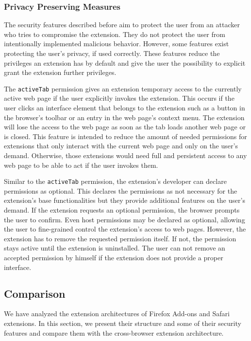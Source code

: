 \subsubsection{Privacy Preserving Measures}

	The security features described before aim to protect the user from an attacker who tries to compromise the extension. They do not protect the user from intentionally implemented malicious behavior. However, some features exist protecting the user's privacy, if used correctly. These features reduce the privileges an extension has by default and give the user the possibility to explicit grant the extension further privileges. 
	
	The \texttt{activeTab} permission gives an extension temporary access to the currently active web page if the user explicitly invokes the extension. This occurs if the user clicks an interface element that belongs to the extension such as a button in the browser's toolbar or an entry in the web page's context menu. The extension will lose the access to the web page as soon as the tab loads another web page or is closed. This feature is intended to reduce the amount of needed permissions for extensions that only interact with the current web page and only on the user's demand. Otherwise, those extensions would need full and persistent access to any web page to be able to act if the user invokes them.
	
	Similar to the \texttt{activeTab} permission, the extension's developer can declare permissions as optional. This declares the permissions as not necessary for the extension's base functionalities but they provide additional features on the user's demand. If the extension requests an optional permission, the browser prompts the user to confirm. Even host permissions may be declared as optional, allowing the user to fine-grained control the extension's access to web pages. However, the extension has to remove the requested permission itself. If not, the permission stays active until the extension is uninstalled. The user can not remove an accepted permission by himself if the extension does not provide a proper interface. 

\subsection{Comparison}
	
	We have analyzed the extension architectures of Firefox Add-ons and Safari extensions. In this section, we present their structure and some of their security features and compare them with the cross-browser extension architecture.

